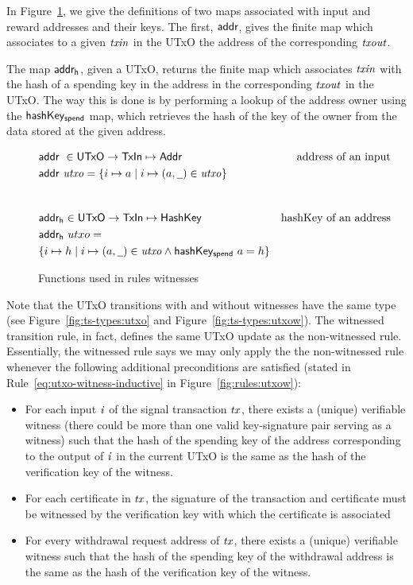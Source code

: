 \documentclass[11pt,a4paper,dvipsnames]{article}
\newcommand{\Addr}{\type{Addr}}
\newcommand{\UTxO}{\type{UTxO}}
\newcommand{\TxIn}{\type{TxIn}}
\newcommand{\HashKey}{\type{HashKey}}
\newcommand{\addr}[1]{\fun{addr}~ \var{#1}}
\newcommand{\wcard}[0]{\underline{\phantom{a}}}
\theoremstyle{definition}
\theoremstyle{definition}
\begin{document}
In Figure~\ref{fig:derived-defs:utxow}, we give the definitions of two maps
associated with input and reward addresses and their keys.
The first, $\mathsf{addr}$, gives the finite map
which associates to a given $\mathit{txin}$ in the UTxO the address of the
corresponding $\mathit{txout}$.

The map $\mathsf{addr_h}$, given a UTxO, returns the
finite map which associates $\mathit{txin}$ with the hash of a spending key in
the address in the corresponding $\mathit{txout}$ in the UTxO. The way this is
done is by performing a lookup of the address owner using the
$\mathsf{hashKey_{spend}}$ map,
which retrieves the hash of the key of
the owner from the data stored at the given address.

\begin{figure}
  \begin{align*}
    & \addr{}{} \in \UTxO \to \TxIn \mapsto \Addr & \text{address of an input}\\
    & \addr{utxo} = \{ i \mapsto a \mid i \mapsto (a, \wcard) \in \var{utxo} \} \\
    \nextdef
    & \fun{addr_h} \in \UTxO \to \TxIn \mapsto \HashKey &
        \text{hashKey of an address}\\
    & \fun{addr_h}~utxo = \\
      &
      \{ i \mapsto h \mid i \mapsto (a, \wcard) \in \var{utxo}
        \wedge \fun{hashKey_{spend}}~{a} = h \} \\
  \end{align*}
  \caption{Functions used in rules witnesses}
  \label{fig:derived-defs:utxow}
\end{figure}


Note that the UTxO transitions with and without witnesses have the same type
(see Figure~\ref{fig:ts-types:utxo} and Figure~\ref{fig:ts-types:utxow}).
The witnessed transition rule, in fact, defines the same UTxO update as the
non-witnessed rule. Essentially, the witnessed rule says we may only apply the
the non-witnessed rule whenever the following
additional preconditions are satisfied
(stated in Rule~\ref{eq:utxo-witness-inductive} in
Figure~\ref{fig:rules:utxow}):

\begin{itemize}
 \item For each input $\mathit{i}$ of the signal transaction $\mathit{tx}$,
 there exists a (unique) verifiable witness (there could be more than one valid
 key-signature pair serving as a witness) such that the hash of the spending key
 of the address corresponding to the output of $\mathit{i}$ in the current UTxO
 is the same as the hash of the verification key of the witness.

 \item For each certificate in $\mathit{tx}$, the signature of the transaction
 and certificate must be witnessed by the
   verification key with which the certificate is associated

 \item For every withdrawal request address of $\mathit{tx}$,
 there exists a (unique) verifiable witness such that the hash of the spending key of the
 withdrawal address is the same as the hash of the verification key of the witness.
\end{itemize}
\end{document}
